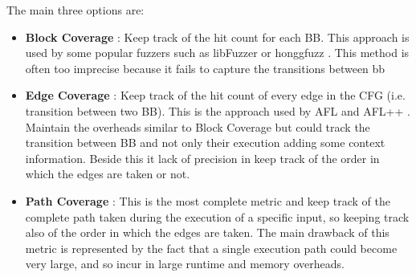     The main three options are:
    \begin{itemize}
        \item \textbf{Block Coverage} : Keep track of the hit count for each \gls{BB}. This approach is used by some 
            popular fuzzers such as libFuzzer or honggfuzz \cite{CollAFL}. This method is often too imprecise because 
            it fails to capture the transitions between bb
        \item \textbf{Edge Coverage} : Keep track of the hit count of every edge in the \gls{CFG} (i.e. transition between two \gls{BB}).
            This is the approach used by AFL and AFL++ \cite{aflplusplus}. Maintain the overheads similar to Block Coverage but could 
            track the transition between \gls{BB} and not only their execution adding some context information.
            Beside this it lack of precision in keep track of the order in which the edges are taken or not.
        \item \textbf{Path Coverage} : This is the most complete metric and keep track of the complete path taken during the execution 
            of a specific input, so keeping track also of the order in which the edges are taken.
            The main drawback of this metric is represented by the fact that a single execution path could become very large, and so 
            incur in large runtime and memory overheads.
    \end{itemize}

